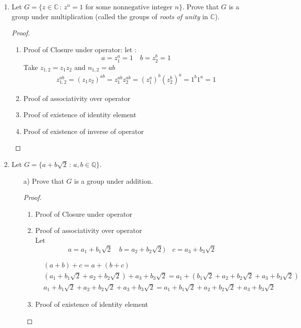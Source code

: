 \documentclass[11pt]{article}
\theoremstyle{definition}  %
\newcommand{\Q}{\mathbb{Q}}
\newcommand{\C}{\mathbb{C}}
\begin{document}
\begin{enumerate}
\begin{proof}
   \end{proof}
   \begin{proof} Proof that G is a group
     \begin{enumerate}
       \item Proof of associativity over operator
       \item Proof of existence of identity element
       \item  Proof of existence of inverse of operator
     \end{enumerate}
   \end{proof}
\item Let $G = \{z \in \C \, : \, z^n = 1 \mbox{  for some nonnegative integer  } n\}$. Prove that $G$ is a group under multiplication (called the groups of {\it roots of unity} in $\C$).
\begin{proof}
  \begin{enumerate}
     \item Proof of Closure under operator:
     let :
     \[
       a=z_1^a=1\quad b=z_2^b=1
     \]
     Take $z_{1,2}=z_1z_2$ and $n_{1,2}=ab$
     \begin{align*}
       z_{1,2}^{ab}=(z_1z_2)^{ab}=z_1^{ab}z_2^{ab}=(z_1^a)^b(z_2^b)^a=1^b1^a=1
     \end{align*}
    \item Proof of associativity over operator
    \item Proof of existence of identity element
    \item  Proof of existence of inverse of operator
  \end{enumerate}
\end{proof}
\item Let $G = \{ a + b\sqrt{2} \, : \, a, b \in \Q\}$.
  \begin{itemize}
  \item[a)] Prove that $G$ is a group under addition.
  \begin{proof}
    \begin{enumerate}
       \item Proof of Closure under operator
      \item Proof of associativity over operator\\
      Let
      \[
        a=a_1+b_1\sqrt{2}\quad b=a_2+b_2\sqrt{2})\quad c= a_3+b_3\sqrt{2}
      \]

      \begin{align*}
        &(a+b)+c=a+(b+c)\\
        &(a_1+b_1\sqrt{2}+a_2+b_2\sqrt{2})+a_3+b_3\sqrt{2}=a_1+(b_1\sqrt{2}+a_2+b_2\sqrt{2}+a_3+b_3\sqrt{2})\\
        &a_1+b_1\sqrt{2}+a_2+b_2\sqrt{2}+a_3+b_3\sqrt{2}=a_1+b_1\sqrt{2}+a_2+b_2\sqrt{2}+a_3+b_3\sqrt{2}
      \end{align*}
      \item Proof of existence of identity element


\end{enumerate}
\end{proof}
\end{itemize}
\end{enumerate}
\end{document}
